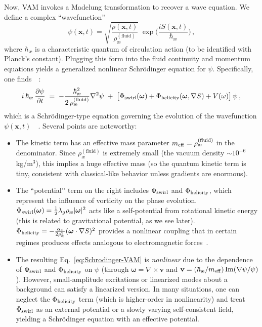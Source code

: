 \documentclass[a4paper,12pt]{article}
\begin{document}
    Now, VAM invokes a Madelung transformation to recover a wave equation. We define a complex “wavefunction”
    \begin{equation}
        \psi(\mathbf{x},t) = \sqrt{\frac{\rho(\mathbf{x},t)}{\rho_{\text{\ae}}^{(\text{fluid})}}}\;\exp\!\Big(\frac{i S(\mathbf{x},t)}{\hbar_{\text{\ae}}}\Big)\,,
        \label{eq:psi-def}
    \end{equation}
    where $\hbar_{\text{\ae}}$ is a characteristic quantum of circulation action (to be identified with Planck’s constant). Plugging this form into the fluid continuity and momentum equations yields a generalized nonlinear Schrödinger equation for $\psi$. Specifically, one finds~\cite{reference_67}~\cite{reference_68}:
    \begin{equation}
        i\,\hbar_{\text{\ae}}\,\frac{\partial \psi}{\partial t} \;=\; -\frac{\hbar_{\text{\ae}}^2}{2\,\rho_{\text{\ae}}^{(\text{fluid})}} \nabla^2 \psi \;+\; \big[\Phi_{\rm swirl}(\boldsymbol{\omega}) + \Phi_{\rm helicity}(\boldsymbol{\omega},\nabla S) + V(\omega)\big]\,\psi\,,
        \label{eq:Schrodinger-VAM}
    \end{equation}
    which is a Schrödinger-type equation governing the evolution of the wavefunction $\psi(\mathbf{x},t)$~\cite{reference_69}~\cite{reference_70}. Several points are noteworthy:
    \begin{itemize}
        \item The kinetic term has an effective mass parameter $m_{\rm eff} = \rho_{\text{\ae}}^{(\text{fluid})}$ in the denominator. Since $\rho_{\text{\ae}}^{(\text{fluid})}$ is extremely small (the vacuum density $\sim 10^{-6}$ kg/m$^3$), this implies a huge effective mass (so the quantum kinetic term is tiny, consistent with classical-like behavior unless gradients are enormous).
        \item The ``potential’’ term on the right includes $\Phi_{\rm swirl}$ and $\Phi_{\rm helicity}$, which represent the influence of vorticity on the phase evolution. $\Phi_{\rm swirl}(\boldsymbol{\omega}) = \frac{1}{2}\lambda_g \rho_{\text{\ae}} |\boldsymbol{\omega}|^2$ acts like a self-potential from rotational kinetic energy (this is related to gravitational potential, as we see later). $\Phi_{\rm helicity} = -\frac{\alpha_e}{2\rho_{\text{\ae}}^2}(\boldsymbol{\omega}\cdot \nabla S)^2$ provides a nonlinear coupling that in certain regimes produces effects analogous to electromagnetic forces~\cite{reference_71}.
        \item The resulting Eq.~\eqref{eq:Schrodinger-VAM} is \emph{nonlinear} due to the dependence of $\Phi_{\rm swirl}$ and $\Phi_{\rm helicity}$ on $\psi$ (through $\boldsymbol{\omega} = \nabla \times \mathbf{v}$ and $\mathbf{v} = (\hbar_{\text{\ae}}/m_{\rm eff}) \Im(\nabla \psi/\psi)$). However, small-amplitude excitations or linearized modes about a background can satisfy a linearized version. In many situations, one can neglect the $\Phi_{\rm helicity}$ term (which is higher-order in nonlinearity) and treat $\Phi_{\rm swirl}$ as an external potential or a slowly varying self-consistent field, yielding a Schrödinger equation with an effective potential.
    \end{itemize}
\end{document}
